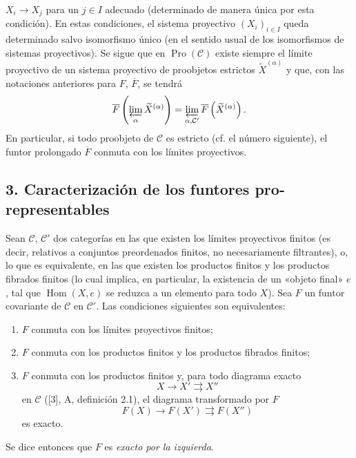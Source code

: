 $X_i\longrightarrow X_j$ para un $j\in I$ adecuado (determinado de manera
única por esta condición). En estas condiciones, el sistema proyectivo
$(X_i)_{i\in I}$ queda determinado salvo isomorfismo único (en el sentido usual
de los isomorfismos de sistemas proyectivos). Se sigue que en
$\operatorname{Pro}(\mathcal C)$ existe siempre el límite proyectivo de un
sistema proyectivo de proobjetos estrictos $\widetilde X^{(\alpha)}$ y que, con
las notaciones anteriores para $F$, $\overline F$, se tendrá
\[
  \overline F\left(\varprojlim_\alpha\widetilde X^{(\alpha)}\right)
  =\varprojlim_{\alpha,\mathcal C'}
  \overline F\left(\widetilde X^{(\alpha)}\right).
\]
En particular, si todo proobjeto de $\mathcal C$ es estricto (cf. el número
siguiente), el funtor prolongado $\overline F$ conmuta con los límites
proyectivos.

\subsection*{3. Caracterización de los funtores pro-representables}

Sean $\mathcal C$, $\mathcal C'$ dos categorías en las que existen los límites
proyectivos finitos (es decir, relativos a conjuntos preordenados finitos, no
necesariamente filtrantes), o, lo que es equivalente, en las que existen los
productos finitos y los productos fibrados finitos (lo cual implica, en
particular, la existencia de un «objeto final» $e$, tal que
$\operatorname{Hom}(X,e)$ se reduzca a un elemento para todo $X$). Sea $F$ un
funtor covariante de $\mathcal C$ en $\mathcal C'$. Las condiciones siguientes
son equivalentes:

\begin{enumerate}
\item[(i)] $F$ conmuta con los límites proyectivos finitos;
\item[(ii)] $F$ conmuta con los productos finitos y los productos fibrados finitos;
\item[(iii)] $F$ conmuta con los productos finitos y, para todo diagrama exacto
\[
  X\longrightarrow X'\rightrightarrows X''
\]
en $\mathcal C$ ([3], A, definición 2.1), el diagrama transformado por $F$
\[
  F(X)\longrightarrow F(X')\rightrightarrows F(X'')
\]
es exacto.
\end{enumerate}

Se dice entonces que $F$ es \emph{exacto por la izquierda}.


